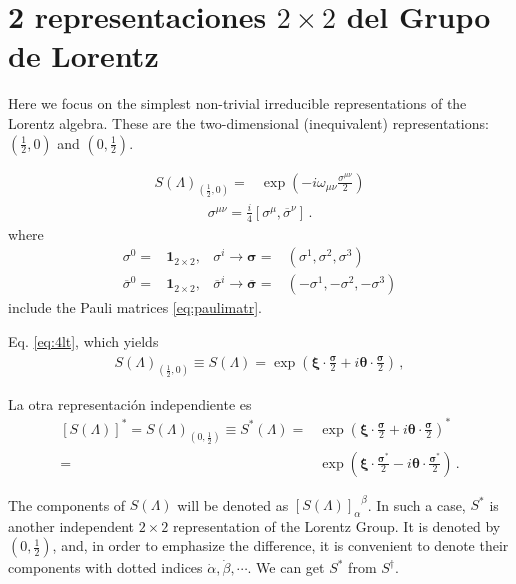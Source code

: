 \section{2 representaciones $2\times 2$ del Grupo de Lorentz}
\begin{frame}
Here we focus on the simplest non-trivial irreducible representations of the Lorentz algebra. These are the two-dimensional (inequivalent) representations: $(\frac{1}{2},0)$ and $(0,\frac{1}{2})$. 

\begin{align}
  S(\Lambda)_{\left( \frac{1}{2},0 \right)}=&\exp\left(-i \omega_{\mu\nu}\frac{\sigma^{\mu\nu}}{2}\right)\nonumber
\end{align}
\begin{align}
  \sigma^{\mu\nu}=\frac{i}{4}\left[\sigma^\mu,\overline{\sigma}^\nu\right]\,.
\end{align}
where
\begin{align}
  \sigma^0=&\mathbf{1}_{2\times2},& \sigma^{i}\to \boldsymbol{\sigma}=&(\sigma^1,\sigma^2,\sigma^3)\nonumber\\
  \overline{\sigma}^0=&\mathbf{1}_{2\times2},& \overline{\sigma}^{i}\to \overline{\boldsymbol{\sigma}}=&(-\sigma^1,-\sigma^2,-\sigma^3)
\end{align}
include the Pauli matrices \eqref{eq:paulimatr}.

\end{frame}
\begin{frame}
Eq. \eqref{eq:4lt}, which yields
\begin{align}
\label{eq:SLet}
  S(\Lambda)_{\left( \frac{1}{2},0 \right)}\equiv S(\Lambda)=
\exp\left( \boldsymbol{\xi}\cdot \frac{\boldsymbol{\sigma}}{2}+i\boldsymbol{\theta}\cdot \frac{\boldsymbol{\sigma}}{2} \right)\,,
\end{align}

La otra representación independiente es
\begin{align}
\label{eq:SLet}
\left[S(\Lambda)\right]^{*} = S(\Lambda)_{\left(0,\frac{1}{2} \right)}\equiv S^{*}(\Lambda)=&
\exp\left( \boldsymbol{\xi}\cdot \frac{\boldsymbol{\sigma}}{2}+i\boldsymbol{\theta}\cdot \frac{\boldsymbol{\sigma}}{2} \right)^{*}\nonumber\\
=&\exp\left( \boldsymbol{\xi}\cdot \frac{\boldsymbol{\sigma}^{*}}{2}-i\boldsymbol{\theta}\cdot \frac{\boldsymbol{\sigma}^{*}}{2} \right)\,.
\end{align}
 
The components of $S(\Lambda)$ will be denoted as ${\left[ S(\Lambda) \right]_{\alpha}}^{\beta}$. In such a case, $S^{*}$ is another independent $2\times2$ representation of the Lorentz Group. It is denoted by $\left( 0,\frac{1}{2}\right)$, and, in order to emphasize the difference, it is convenient to denote their components with dotted indices $\dot{\alpha},\dot{\beta},\cdots$. We can get $S^{*}$ from $S^{\dagger}$.
\end{frame}


